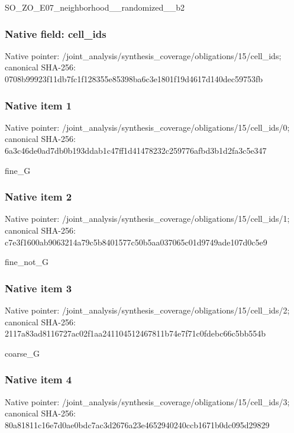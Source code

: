 \documentclass[10pt,a4paper]{article}
\begin{document}
\begingroup\raggedright\sloppy SO\_\allowbreak{}ZO\_\allowbreak{}E07\_\allowbreak{}neighborhood\_\allowbreak{}\_\allowbreak{}randomized\_\allowbreak{}\_\allowbreak{}b2\par\endgroup

\subsubsection{Native field: cell\_\allowbreak{}ids}
Native pointer: /joint\_\allowbreak{}analysis/synthesis\_\allowbreak{}coverage/obligations/15/cell\_\allowbreak{}ids; canonical SHA-256: 0708b99923f11db7fc1f128355e85398ba6c3e1801f19d4617d140dec59753fb

\subsubsection{Native item 1}
Native pointer: /joint\_\allowbreak{}analysis/synthesis\_\allowbreak{}coverage/obligations/15/cell\_\allowbreak{}ids/0; canonical SHA-256: 6a3c46de0ad7db0b193ddab1c47ff1d41478232c259776afbd3b1d2fa3c5e347

\begingroup\raggedright\sloppy fine\_\allowbreak{}G\par\endgroup

\subsubsection{Native item 2}
Native pointer: /joint\_\allowbreak{}analysis/synthesis\_\allowbreak{}coverage/obligations/15/cell\_\allowbreak{}ids/1; canonical SHA-256: c7e3f1600ab9063214a79c5b8401577c50b5aa037065c01d9749ade107d0c5e9

\begingroup\raggedright\sloppy fine\_\allowbreak{}not\_\allowbreak{}G\par\endgroup

\subsubsection{Native item 3}
Native pointer: /joint\_\allowbreak{}analysis/synthesis\_\allowbreak{}coverage/obligations/15/cell\_\allowbreak{}ids/2; canonical SHA-256: 2117a83ad8116727ac02f1aa241104512467811b74e7f71c0fdebc66c5bb554b

\begingroup\raggedright\sloppy coarse\_\allowbreak{}G\par\endgroup

\subsubsection{Native item 4}
Native pointer: /joint\_\allowbreak{}analysis/synthesis\_\allowbreak{}coverage/obligations/15/cell\_\allowbreak{}ids/3; canonical SHA-256: 80a81811c16e7d0ae0bdc7ac3d2676a23e4652940240ccb1671b0dc095d29829
\end{document}
